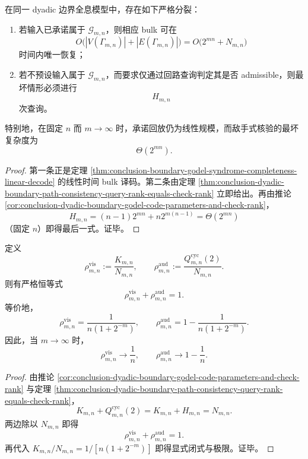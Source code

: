 \begin{theorem}[承诺回放与敌手式核验之间的严格复杂度分裂]\label{thm:conclusion-dyadic-boundary-constructive-replay-vs-adversarial-verification-split}
在同一 dyadic 边界全息模型中，存在如下严格分裂：
\begin{enumerate}
  \item 若输入已承诺属于 \(\mathcal G_{m,n}\)，则相应 bulk 可在
  \[
  O\bigl(|V(\Gamma_{m,n})|+|E(\Gamma_{m,n})|\bigr)
  =
  O\bigl(2^{mn}+N_{m,n}\bigr)
  \]
  时间内唯一恢复；
  \item 若不预设输入属于 \(\mathcal G_{m,n}\)，而要求仅通过回路查询判定其是否 admissible，则最坏情形必须进行
  \[
  H_{m,n}
  \]
  次查询。
\end{enumerate}
特别地，在固定 \(n\) 而 \(m\to\infty\) 时，承诺回放仍为线性规模，而敌手式核验的最坏复杂度为
\[
\Theta(2^{mn}).
\]
\end{theorem}

\begin{proof}
第一条正是定理 \ref{thm:conclusion-boundary-godel-syndrome-completeness-linear-decode} 的线性时间 bulk 译码。第二条由定理 \ref{thm:conclusion-dyadic-boundary-path-consistency-query-rank-equals-check-rank} 立即给出。再由推论 \ref{cor:conclusion-dyadic-boundary-godel-code-parameters-and-check-rank}，
\[
H_{m,n}=(n-1)2^{mn}+n2^{m(n-1)}=\Theta(2^{mn})
\]
（固定 \(n\)）即得最后一式。证毕。
\end{proof}

\begin{corollary}[可见信息密度与敌手审计密度的精确互补律]\label{cor:conclusion-dyadic-boundary-visible-audit-density-complementarity}
定义
\[
\rho_{m,n}^{\mathrm{vis}}:=\frac{K_{m,n}}{N_{m,n}},
\qquad
\rho_{m,n}^{\mathrm{aud}}:=\frac{Q_{m,n}^{\mathrm{cyc}}(2)}{N_{m,n}}.
\]
则有严格恒等式
\[
\rho_{m,n}^{\mathrm{vis}}+\rho_{m,n}^{\mathrm{aud}}=1.
\]
等价地，
\[
\rho_{m,n}^{\mathrm{vis}}=\frac{1}{n(1+2^{-m})},
\qquad
\rho_{m,n}^{\mathrm{aud}}=1-\frac{1}{n(1+2^{-m})}.
\]
因此，当 \(m\to\infty\) 时，
\[
\rho_{m,n}^{\mathrm{vis}}\to \frac1n,
\qquad
\rho_{m,n}^{\mathrm{aud}}\to 1-\frac1n.
\]
\end{corollary}

\begin{proof}
由推论 \ref{cor:conclusion-dyadic-boundary-godel-code-parameters-and-check-rank} 与定理 \ref{thm:conclusion-dyadic-boundary-path-consistency-query-rank-equals-check-rank}，
\[
K_{m,n}+Q_{m,n}^{\mathrm{cyc}}(2)=K_{m,n}+H_{m,n}=N_{m,n}.
\]
两边除以 \(N_{m,n}\) 即得
\[
\rho_{m,n}^{\mathrm{vis}}+\rho_{m,n}^{\mathrm{aud}}=1.
\]
再代入 \(K_{m,n}/N_{m,n}=1/[n(1+2^{-m})]\) 即得显式闭式与极限。证毕。
\end{proof}
